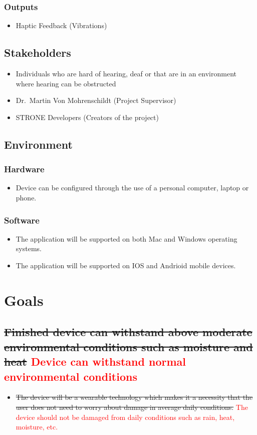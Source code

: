 \documentclass[12pt, titlepage]{article}
\begin{document}
\subsubsection {Outputs}
\begin{itemize}
    \item Haptic Feedback (Vibrations)
\end{itemize}

\subsection{Stakeholders}
\begin{itemize}
    \item Individuals who are hard of hearing, deaf or that are in an environment where hearing can be obstructed
    \item Dr.\ Martin Von Mohrenschildt (Project Supervisor)
    \item STRONE Developers (Creators of the project)
\end{itemize}

\subsection{Environment}
\subsubsection{Hardware}
\begin{itemize}
    \item Device can be configured through the use of a personal computer, laptop or phone.
\end{itemize}
\subsubsection{Software}
\begin{itemize}
    \item The application will be supported on both Mac and Windows operating systems.
    \item The application will be supported on IOS and Andrioid mobile devices.   
\end{itemize}

\section{Goals}
\subsection{\sout{Finished device can withstand above moderate environmental conditions such as moisture and heat} \textcolor{red}{Device can withstand normal environmental conditions}}
\begin{itemize}
    \item \sout{The device will be a wearable technology which makes it a necessity that the user does not need to worry about damage in average daily conditions.} \textcolor{red}{The device should not be damaged from daily conditions such as rain, heat, moisture, etc.}
   \end{itemize} 
\end{document}
